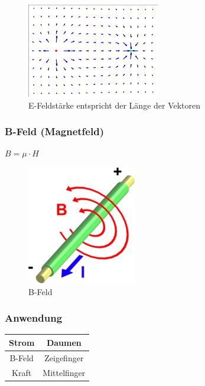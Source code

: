 \documentclass[a4paper]{scrartcl}
\begin{document}
\begin{figure}[h!]
\begin{center}
\includegraphics[scale=0.5]{images/E-Feldstaerke.png}
\caption{E-Feldstärke entspricht der Länge der Vektoren}
\label{fig:E-Feldstaerke}
\end{center}
\end{figure}



\subsubsection{B-Feld (Magnetfeld)}
$B = \mu \cdot H$\\
\begin{figure}[h!]
\begin{center}
\includegraphics[scale=0.5]{images/B-Feld.png}
\caption{B-Feld}
\label{fig:B-Feld}
\end{center}
\end{figure}

\subsubsection{Anwendung}

\begin{center}
\begin{tabular}{|c|c|}

\hline Strom & Daumen \\ 
\hline B-Feld & Zeigefinger \\ 
\hline Kraft & Mittelfinger \\ 
\hline 

\end{tabular} 
\end{center}
\end{document}
